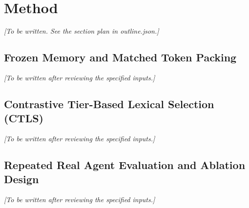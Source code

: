 \section{Method}
\label{sec:method}
\textit{[To be written. See the section plan in outline.json.]}
\subsection{Frozen Memory and Matched Token Packing}
\label{sec:method_baseline}
\textit{[To be written after reviewing the specified inputs.]}
\subsection{Contrastive Tier-Based Lexical Selection (CTLS)}
\label{sec:method_ctls}
\textit{[To be written after reviewing the specified inputs.]}
\subsection{Repeated Real Agent Evaluation and Ablation Design}
\label{sec:method_protocol}
\textit{[To be written after reviewing the specified inputs.]}
